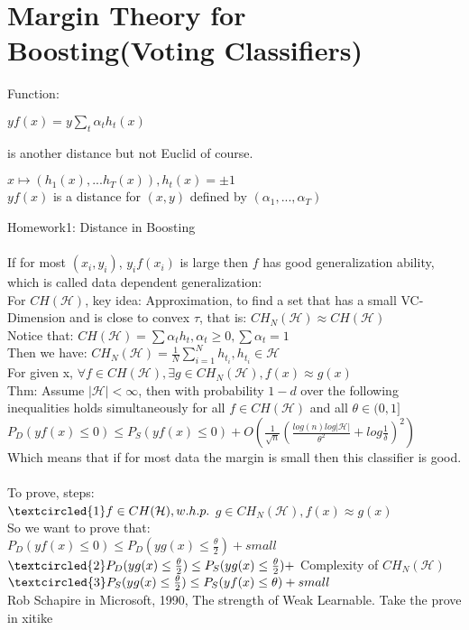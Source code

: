 \documentclass{article}
\begin{document}
\section{Margin Theory for Boosting(Voting Classifiers)}
Function:
\begin{center}
$yf(x)=y \sum_{t}\alpha_th_t(x)$
\end{center}
is another distance but not Euclid of course.
\begin{center}
$x\mapsto(h_1(x),...h_T(x)), h_t(x)=\pm1$
\\$yf(x)$ is a distance for $(x,y)$ defined by $(\alpha_1,...,\alpha_T)$
\end{center}
Homework1: Distance in Boosting\\
\\If for most $(x_i,y_i)$, $y_if(x_i)$ is large then $f$ has good generalization ability, which is called data dependent generalization:
\\For $CH(\mathcal{H})$, key idea: Approximation, to find a set that has a small VC-Dimension and is close to convex $\tau$, that is: $CH_N(\mathcal{H})\approx CH(\mathcal{H})$
\\Notice that: $CH(\mathcal{H})={\sum\alpha_th_t, \alpha_t \geq0, \sum\alpha_t=1}$
\\Then we have: $CH_N(\mathcal{H})={\frac{1}{N}\sum_{i=1}^Nh_{t_i},h_{t_i}\in\mathcal{H}}$
\\For given x, $\forall f\in CH(\mathcal{H}), \exists g\in CH_N(\mathcal{H}), f(x)\approx g(x)$
\\Thm: Assume $|\mathcal{H}|<\infty$, then with probability $1-d$ over the following inequalities holds simultaneously for all $f\in CH(\mathcal{H})$ and all $\theta\in (0,1]$
\\$P_D(yf(x)\leq0)\leq P_S(yf(x)\leq0)+O(\frac{1}{\sqrt{n}}(\frac{log(n)log|\mathcal{H}|}{\theta^2}+log\frac{1}{\delta})^2)$
\\Which means that if for most data the margin is small then this classifier is good.
\\\\To prove, steps:
\\$\textcircled{1} f\in CH(\mathcal{H}), w.h.p.$     $g\in CH_N(\mathcal{H}), f(x)\approx g(x)$
\\So we want to prove that:
\\$P_D(yf(x)\leq0)\leq P_D(yg(x)\leq\frac{\theta}{2})+small$
\\$\textcircled{2} P_D(yg(x)\leq\frac{\theta}{2})\leq P_S(yg(x)\leq\frac{\theta}{2})+$ Complexity of $CH_N(\mathcal{H})$
\\$\textcircled{3} P_S(yg(x)\leq\frac{\theta}{2})\leq P_S(yf(x)\leq\theta)+small$
\\Rob Schapire in Microsoft, 1990, The strength of Weak Learnable. Take the prove in xitike
\end{document}

